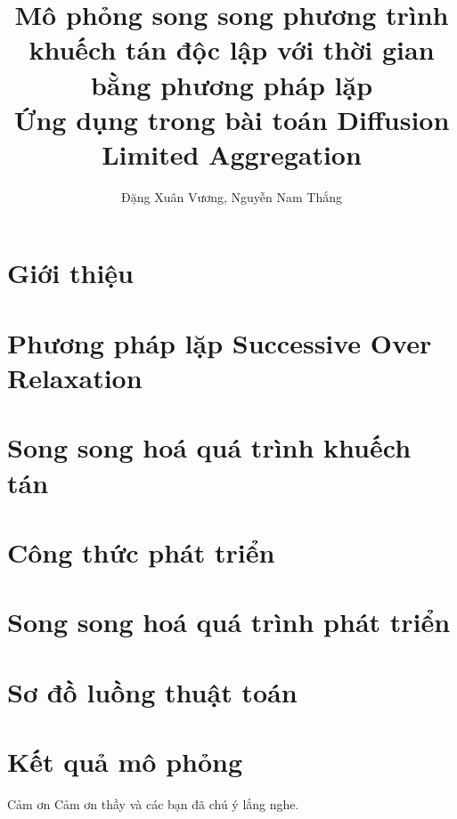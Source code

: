 \documentclass[11pt]{beamer}
\title[Hà Nội, Việt Nam]{Mô phỏng song song phương trình khuếch tán độc lập với thời gian bằng phương pháp lặp\\
Ứng dụng trong bài toán Diffusion Limited Aggregation}
\author[Xuân Vương, Nam Thắng]{
Đặng Xuân Vương, Nguyễn Nam Thắng}
\begin{document}


\section{Giới thiệu} 


\section{Phương pháp lặp Successive Over Relaxation}


\section{Song song hoá quá trình khuếch tán}


\section{Công thức phát triển}


\section{Song song hoá quá trình phát triển}


\section{Sơ đồ luồng thuật toán}


\section{Kết quả mô phỏng}


\begin{frame}{Cảm ơn}
    \large{Cảm ơn thầy và các bạn đã chú ý lắng nghe.}
\end{frame}

\begin{frame}
\titlepage 
\end{frame}
\end{document}
